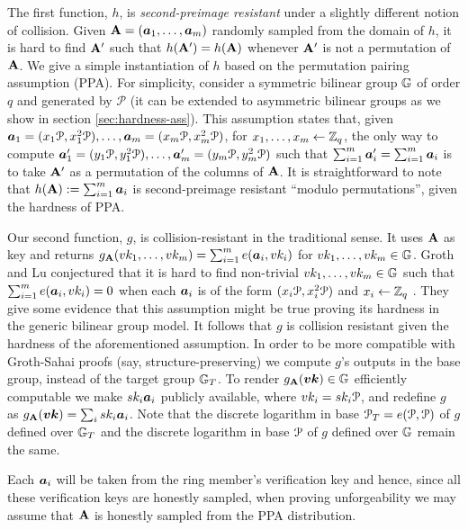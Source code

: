 The first function, $h$, is \emph{second-preimage resistant} under a slightly different notion of collision. Given $\mathbf{{A}}=({\boldsymbol{a}}_1,\ldots,\allowbreak {\boldsymbol{a}}_m)$ randomly sampled from the domain of $h$, it is hard to find $\mathbf{{A}}'$ such that $h(\mathbf{{A}}')=h(\mathbf{{A}})$ whenever $\mathbf{{A}}'$ is not a permutation of $\mathbf{{A}}$.
We give a simple instantiation of $h$ based on the permutation pairing assumption (PPA). For simplicity, consider a symmetric bilinear group $\mathbb{G}$ of order $q$ and generated by $\mathcal{P}$ (it can be extended to asymmetric bilinear groups as we show in section \ref{sec:hardness-ass}). This assumption states that, given ${\boldsymbol{a}}_1 = (x_1\mathcal{P},x_1^2\mathcal{P}),\ldots,{\boldsymbol{a}}_m=(x_m\mathcal{P},x^2_m\mathcal{P})$, for $x_1,\ldots,x_m\gets\mathbb{Z}_q$, the only way to compute ${\boldsymbol{a}}'_1=(y_1\mathcal{P},y_1^2\mathcal{P}),\ldots,{\boldsymbol{a}}'_m=(y_m\mathcal{P},y_m^2\mathcal{P})$ such that $\sum_{i=1}^m {\boldsymbol{a}}'_i = \sum_{i=1}^m{\boldsymbol{a}}_i$ is to take $\mathbf{{A}}'$ as a permutation of the columns of $\mathbf{{A}}$.  It is straightforward to note that $h(\mathbf{{A}}) := \sum_{i=1}^m {\boldsymbol{a}}_i$ is second-preimage resistant ``modulo permutations'', given the hardness of PPA.

Our second function, $g$, is collision-resistant in the traditional sense. It uses $\mathbf{{A}}$ as key and returns $g_{\mathbf{{A}}}(vk_1,\ldots,vk_m) = \sum_{i=1}^m e({\boldsymbol{a}}_i,vk_i)$ for $vk_1,\ldots,vk_m\in\mathbb{G}$.  Groth and Lu conjectured that it is hard to find non-trivial $vk_1,\ldots,vk_m\in\mathbb{G}$ such that $\sum_{i=1}^m e({\boldsymbol{a}}_i,vk_i)=0$ when each ${\boldsymbol{a}}_i$ is of the form $(x_i\mathcal{P},x_i^2\mathcal{P})$ and $x_i\gets\mathbb{Z}_q$ \cite{AC:GroLu07}. They give some evidence that this assumption might be true proving its hardness in the generic bilinear group model. It follows that $g$ is collision resistant given the hardness of the aforementioned assumption. In order to be more compatible with Groth-Sahai proofs (say, structure-preserving) we compute $g$'s outputs in the base group, instead of the target group $\mathbb{G}_T$. To render $g_{\mathbf{{A}}}({\boldsymbol{vk}})\in\mathbb{G}$ efficiently computable we make $sk_i{\boldsymbol{a}}_i$ publicly available, where $vk_i = sk_i\mathcal{P}$, and redefine $g$ as $g_{\mathbf{{A}}}({\boldsymbol{vk}}) = \sum_i sk_i{\boldsymbol{a}}_i$. Note that the discrete logarithm in base $\mathcal{P}_T = e(\mathcal{P},\mathcal{P})$ of $g$ defined over $\mathbb{G}_T$ and the discrete logarithm in base $\mathcal{P}$ of $g$ defined over $\mathbb{G}$ remain the same.

Each ${\boldsymbol{a}}_i$ will be taken from the ring member's verification key and hence, since all these verification keys are honestly sampled, when proving unforgeability we may assume that $\mathbf{{A}}$ is honestly sampled from the PPA distribution. %

